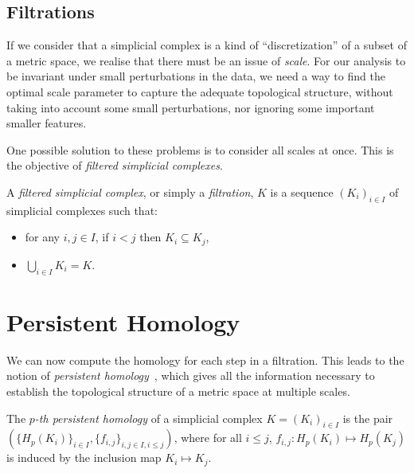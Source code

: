 \documentclass[a4paper,11pt,openany,extrafontsizes]{memoir}
\begin{document}
\subsection{Filtrations}%
\label{sec:filtrations}


If we consider that a simplicial complex is a kind of
``discretization'' of a subset of a metric space, we realise that
there must be an issue of \emph{scale}. For our analysis to be
invariant under small perturbations in the data, we need a way to find
the optimal scale parameter to capture the adequate topological
structure, without taking into account some small perturbations, nor
ignoring some important smaller features.

One possible solution to these problems is to consider all scales at
once. This is the objective of \emph{filtered simplicial complexes}.

\begin{defn}[Filtration]\label{defn:filt}
  A \emph{filtered simplicial complex}, or simply a \emph{filtration},
  $K$ is a sequence ${(K_i)}_{i\in I}$ of simplicial complexes such
  that:
  \begin{itemize}
  \item for any $i, j \in I$, if $i < j$ then $K_i \subseteq K_j$,
  \item $\bigcup_{i\in I} K_i = K$.
  \end{itemize}
\end{defn}

\section{Persistent Homology}%
\label{sec:persistent-homology}

We can now compute the homology for each step in a filtration. This
leads to the notion of \emph{persistent
  homology}~\cite{carlsson_topology_2009,zomorodian_computing_2005},
which gives all the information necessary to establish the topological
structure of a metric space at multiple scales.

\begin{defn}
  The \emph{$p$-th persistent homology} of a simplicial complex
  $K = {(K_i)}_{i\in I}$ is the pair
  $(\{H_p(K_i)\}_{i\in I}, \{f_{i,j}\}_{i,j\in I, i\leq j})$, where
  for all $i\leq j$, $f_{i,j} : H_p(K_i) \mapsto H_p(K_j)$ is induced
  by the inclusion map $K_i \mapsto K_j$.
\end{defn}
\end{document}
